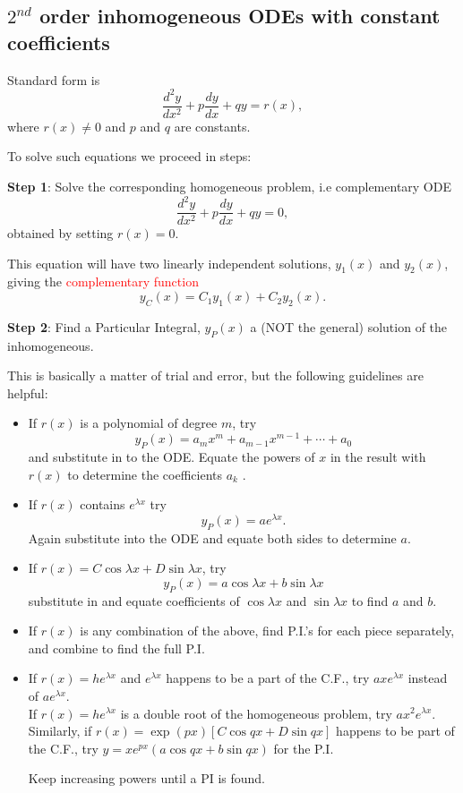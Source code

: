 \documentclass{article}
\begin{document}
\subsection{$2^{nd}$ order inhomogeneous ODEs with constant coefficients}

Standard form is
$$
\frac{d^2 y}{dx^2} + p \frac{dy}{dx} + q  y = r(x),
$$
where $ r(x) \ne 0$ and $p$ and $q$ are constants.

To solve such equations we proceed in steps:

\textbf{Step 1}: Solve the corresponding homogeneous problem,
i.e complementary ODE
$$
\frac{d^2 y}{dx^2} + p \frac{dy}{dx} + q  y = 0,
$$
obtained by setting $r(x)=0$. 

This equation will have two linearly independent solutions, $y_1(x)$
and $y_2(x)$, giving the \textcolor{red}{complementary function}
$$
y_C (x) = C_1 y_1 (x) + C_2 y_2 (x).
$$


\textbf{Step 2}: Find a Particular Integral, $y_P (x)$ a (NOT the general) solution of the inhomogeneous. 

This is basically a matter of trial and error, but the following guidelines are helpful:
\begin{itemize}
\item If $r(x)$ is a polynomial of degree $m$, try
$$
y_P (x) = a_m x^m + a_{m-1} x^{m-1} + \cdots +a_0
$$
and substitute in to the ODE. Equate the powers of $x$ in the
result with $r(x)$ to determine the coefficients $a_k$ .
\item
If $r(x)$ contains $e^{\lambda x}$ try
$$
y_P (x) = a e^{\lambda x}.
$$
Again substitute into the ODE and equate both sides to determine $a$.
\end{itemize}


\begin{itemize}
\item
If $r(x) = C \cos \lambda x + D \sin \lambda x$, try 
$$
y_P (x) = a \cos \lambda x + b \sin \lambda x
$$
substitute in and equate coefficients of $\cos \lambda x$ and $ \sin \lambda x$ to find $a$ and $b$.
\item
If $r(x)$ is any combination of the above, find P.I.'s for each piece separately, and combine to find the full P.I.
\item
If $r(x) = h e^{\lambda x}$ and $e^{\lambda x}$ happens to be
a part of the C.F., try $a x e^{\lambda x}$ instead of $a
e^{\lambda x}$. \\
If $r(x) = he^{\lambda x}$ is a double root of the homogeneous
problem, try $a x^2 e^{\lambda x}$.\\
Similarly,  if $r(x)= \exp(px) [C \cos q x + D \sin q x]$ happens
to be part of the C.F., try $y = x e^{px} (a \cos q x + b \sin q
x)$ for the P.I.

Keep increasing powers until a PI is found.
\end{itemize}
\end{document}
